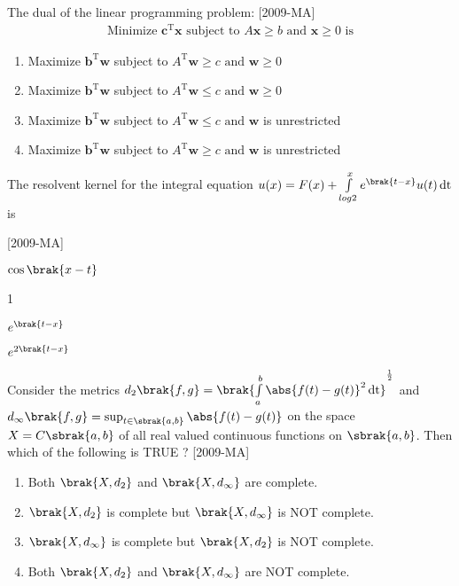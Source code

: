 \item The dual of the linear programming problem: \hfill{[2009-MA]}
\begin{align*}
    \text{Minimize } \textbf{c}^{\mathrm{T}}\textbf{x} \text{ subject to } A\textbf{x}\geq b \text{ and } \textbf{x} \geq 0 \text{ is}
\end{align*} 
\begin{enumerate}
    \item Maximize $\textbf{b}^{\mathrm{T}}\textbf{w}$ subject to $A^{\mathrm{T}}\textbf{w}\geq c \text{ and } \textbf{w}\geq 0$ 
    \item Maximize $\textbf{b}^{\mathrm{T}}\textbf{w}$ subject to $A^{\mathrm{T}}\textbf{w}\leq c \text{ and } \textbf{w}\geq 0$ 
    \item Maximize $\textbf{b}^{\mathrm{T}}\textbf{w}$ subject to $A^{\mathrm{T}}\textbf{w}\leq c \text{ and } \textbf{w}$ is unrestricted
    \item Maximize $\textbf{b}^{\mathrm{T}}\textbf{w}$ subject to $A^{\mathrm{T}}\textbf{w}\geq c \text{ and } \textbf{w}$ is unrestricted
\end{enumerate}

\item The resolvent kernel for the integral equation $u(x)=F(x)+\int \limits_{log 2}^x e^{\brak{t-x}}u(t)\, \text{dt}$ is 
    
     \hfill{[2009-MA]}
\begin{enumerate}
\begin{multicols}{4}
\item $\cos \brak{x-t}$
\item 1
\item $e^{\brak{t-x}}$
\item $e^{2\brak{t-x}}$
\end{multicols}
\end{enumerate}

\item Consider the metrics $d_2 \brak{f,g}=\brak{\int \limits_{a}^b \abs{f(t)-g(t)}^2\, \text{dt}}^\frac{1}{2}$ and $d_{\infty}\brak{f,g}=\sup_{t \in \sbrak{a,b}} \abs{f(t)-g(t)}$ on the space $X=C\sbrak{a,b}$ of all real valued continuous functions on $\sbrak{a,b}$. Then which of the following is TRUE ? \hfill{[2009-MA]}
\begin{enumerate}
    \item Both $\brak{X,d_2}$ and $\brak{X,d_{\infty}}$ are complete.
    \item $\brak{X,d_2}$ is complete but $\brak{X,d_{\infty}}$ is NOT complete.
    \item $\brak{X,d_{\infty}}$ is complete but $\brak{X,d_2}$ is NOT complete.
    \item Both $\brak{X,d_2}$ and $\brak{X,d_{\infty}}$ are NOT complete.
\end{enumerate}

